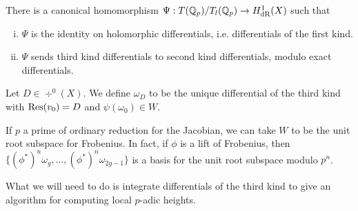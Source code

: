 \begin{prop}
There is a canonical homomorphism $\Psi: T(\mathbb{Q}_p)/T_l(\mathbb{Q}_p) \to H_{\text{dR}}^1(X)$ such that
        \begin{enumerate}[(i)]
        \item $\Psi$ is the identity on holomorphic differentials, i.e. differentials of the first kind.
        \item $\Psi$ sends third kind differentials to second kind differentials, modulo exact differentials.
        \end{enumerate}
\end{prop}


\begin{dfn}[$\omega_D$]
Let $D \in \div^0(X)$. We define $\omega_D$ to be the unique differential of the third kind with  $\operatorname{Res}(v_0)= D$ and $\psi(\omega_0) \in W$.
\end{dfn}


\begin{rem}
If $p$ a prime of ordinary reduction for the Jacobian, we can take $W$ to be the unit root subspace for Frobenius. In fact, if $\phi$ is a lift of Frobenius, then $\{ (\phi^*)^n \omega_g, \ldots, (\phi^*)^n\omega_{2g-1}\}$ is a basis for the unit root subspace modulo $p^n$.
\end{rem}


What we will need to do is integrate differentials of the third kind to give an algorithm for computing local $p$-adic heights. 

